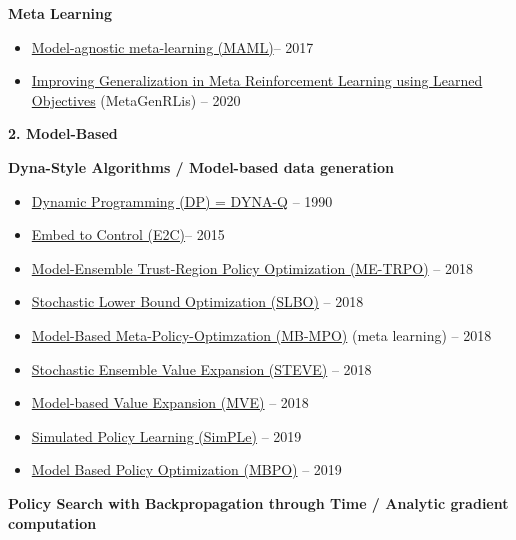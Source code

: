\documentclass[
  a4paper,
  DIV=11,
  numbers=noendperiod]{scrreprt}
\providecommand{\tightlist}{%
  \setlength{\itemsep}{0pt}\setlength{\parskip}{0pt}}\usepackage{longtable,booktabs,array}
\begin{document}
\textbf{Meta Learning}

\begin{itemize}
\tightlist
\item
  \href{https://arxiv.org/abs/1703.03400}{Model-agnostic meta-learning
  (MAML)}-- 2017
\item
  \href{https://openreview.net/pdf?id=S1evHerYPr}{Improving
  Generalization in Meta Reinforcement Learning using Learned
  Objectives} (MetaGenRLis) -- 2020
\end{itemize}

\textbf{2. Model-Based}

\textbf{Dyna-Style Algorithms / Model-based data generation}

\begin{itemize}
\tightlist
\item
  \href{http://citeseerx.ist.psu.edu/viewdoc/download?doi=10.1.1.51.7362\&rep=rep1\&type=pdf}{Dynamic
  Programming (DP) = DYNA-Q} -- 1990
\item
  \href{https://arxiv.org/abs/1506.07365}{Embed to Control (E2C)}-- 2015
\item
  \href{https://arxiv.org/abs/1802.10592}{Model-Ensemble Trust-Region
  Policy Optimization (ME-TRPO)} -- 2018
\item
  \href{https://arxiv.org/abs/1807.03858}{Stochastic Lower Bound
  Optimization (SLBO)} -- 2018
\item
  \href{https://arxiv.org/abs/1809.05214}{Model-Based
  Meta-Policy-Optimzation (MB-MPO)} (meta learning) -- 2018
\item
  \href{https://arxiv.org/abs/1803.00101}{Stochastic Ensemble Value
  Expansion (STEVE)} -- 2018
\item
  \href{https://arxiv.org/abs/1803.00101}{Model-based Value Expansion
  (MVE)} -- 2018
\item
  \href{https://arxiv.org/abs/1903.00374}{Simulated Policy Learning
  (SimPLe)} -- 2019
\item
  \href{https://arxiv.org/abs/1906.08253}{Model Based Policy
  Optimization (MBPO)} -- 2019
\end{itemize}

\textbf{Policy Search with Backpropagation through Time / Analytic
gradient computation}
\end{document}
